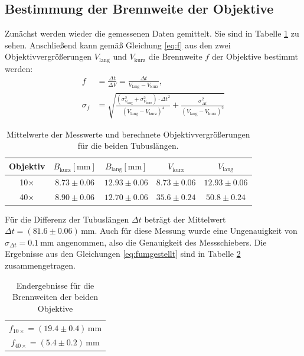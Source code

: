 \documentclass[12pt,a4paper,titlepage,headinclude]{scrartcl}
\numberwithin{equation}{subsection}
\begin{document}
\subsection{Bestimmung der Brennweite der Objektive}
Zunächst werden wieder die gemessenen Daten gemittelt. Sie sind in Tabelle \ref{tab:Mittel2} zu sehen. Anschließend kann gemäß Gleichung \eqref{eq:f} aus den zwei Objektivvergrößerungen $V_{\text{lang}}$ und $V_\text{kurz}$ die Brennweite $f$ der Objektive bestimmt werden:
	\begin{align}
		f&=\frac{\Delta t}{\Delta V}=\frac{\Delta t}{V_\text{lang}-V_\text{kurz}},\\
		\sigma_f&=\sqrt{\frac{(\sigma_{V_\text{lang}}^2+\sigma_{V_\text{kurz}}^2)\cdot\Delta t^2}{(V_{\text{lang}}-V_\text{kurz})^4}+\frac{\sigma_{\Delta t}^2}{(V_{\text{lang}}-V_\text{kurz})^2}}
		\label{eq:fumgestellt}
	\end{align}
	\begin{table}
		\centering
		\begin{tabular}{|c|c|c|c|c|}
			\hline
			Objektiv&$B_\text{kurz} [\text{mm}]$&$B_\text{lang} [\text{mm}]$&$V_\text{kurz}$&$V_\text{lang}$\\\hline
			10$\times$&$8.73\pm0.06$&$12.93\pm0.06$&$8.73\pm0.06$&$12.93\pm0.06$\\\hline
			40$\times$&$8.90\pm0.06$&$12.70\pm0.06$&$35.6\pm0.24$&$50.8\pm0.24$\\\hline
		\end{tabular}
		\caption{Mittelwerte der Messwerte und berechnete Objektivvergrößerungen für die beiden Tubuslängen.}
		\label{tab:Mittel2}
	\end{table}
	Für die Differenz der Tubuslängen $\Delta t$ beträgt der Mittelwert $\Delta t=(81.6\pm0.06)\,\text{mm}$.
	Auch für diese Messung wurde eine Ungenauigkeit von $\sigma_{\Delta t}=\SI{0.1}{\milli\metre}$ angenommen, also die Genauigkeit des Messschiebers. 
	Die Ergebnisse aus den Gleichungen \eqref{eq:fumgestellt} sind in Tabelle \ref{tab:f} zusammengetragen.
	\begin{table}[H]
		\centering
		\begin{tabular}{c}
			$f_{10\times}=(19.4\pm0.4)\,$mm\\
			$f_{40\times}=(5.4\pm0.2)\,$mm
		\end{tabular}
		\caption{Endergebnisse für die Brennweiten der beiden Objektive}
		\label{tab:f}
	\end{table}
	
\end{document}
